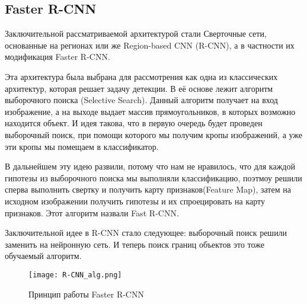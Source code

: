 \documentclass[../document.tex]{subfiles}
\begin{document}
	\subsection{Faster R-CNN}
		\par Заключительной рассматриваемой архитектурой стали Сверточные сети, основанные на регионах
 или же Region-based CNN (R-CNN), а в частности их модификация Faster R-CNN.
 		\par Эта архитектура была выбрана для рассмотрения как одна из классических архитектур, которая решает задачу детекции. В её основе лежит алгоритм выборочного поиска (Selective Search). Данный алгоритм получает на вход изображение, а на выходе выдает массив прямоугольников, в которых возможно находится объект. И идея такова, что в первую очередь будет проведен выборочный поиск, при помощи которого мы получим кропы изображений, а уже эти кропы мы помещаем в классификатор.
 		\par В дальнейшем эту идею развили, потому что нам не нравилось, что для каждой гипотезы из выборочного поиска мы выполняли классификацию, поэтмоу решили сперва выполнить свертку и получить карту признаков(Feature Map), затем на исходном изображении получить гипотезы и их спроецировать на карту признаков. Этот алгоритм назвали Fast R-CNN.
 		\par Заключительной идее в R-CNN стало следующее: выборочный поиск решили заменить на нейронную сеть. И теперь поиск границ объектов это тоже обучаемый алгоритм.
 		
 		\begin{figure}[H]
 			\centering
 			\texttt{[image: R-CNN\_alg.png]}
 			\caption{Принцип работы Faster R-CNN}
 		\end{figure}
 		
\end{document}
